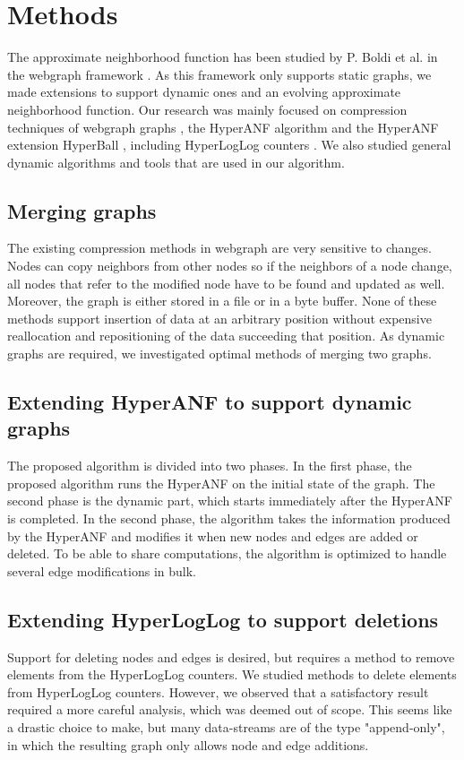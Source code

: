 \chapter{Methods}

The approximate neighborhood function has been studied by P. Boldi et al. in the webgraph framework \cite{webgraph}. As this framework only supports static graphs, we made extensions to support dynamic ones and an evolving approximate neighborhood function. Our research was mainly focused on compression techniques of webgraph graphs \cite{webgraph-compression}, the HyperANF algorithm \cite{hyperanf} and the HyperANF extension HyperBall \cite{hyperball}, including HyperLogLog counters \cite{hyperloglog}. We also studied general dynamic algorithms and tools that are used in our algorithm.

\section{Merging graphs}
The existing compression methods in webgraph are very sensitive to changes. Nodes can copy neighbors from other nodes so if the neighbors of a node change, all nodes that refer to the modified node have to be found and updated as well. Moreover, the graph is either stored in a file or in a byte buffer. None of these methods support insertion of data at an arbitrary position without expensive reallocation and repositioning of the data succeeding that position. As dynamic graphs are required, we investigated optimal methods of merging two graphs.

\section{Extending HyperANF to support dynamic graphs}
The proposed algorithm is divided into two phases. In the first phase, the proposed algorithm runs the HyperANF on the initial state of the graph. The second phase is the dynamic part, which starts immediately after the HyperANF is completed. In the second phase, the algorithm takes the information produced by the HyperANF and modifies it when new nodes and edges are added or deleted. To be able to share computations, the algorithm is optimized to handle several edge modifications in bulk.

\section{Extending HyperLogLog to support deletions}
Support for deleting nodes and edges is desired, but requires a method to remove elements from the HyperLogLog counters. We studied methods to delete elements from HyperLogLog counters. However, we observed that a satisfactory result required a more careful analysis, which was deemed out of scope. This seems like a drastic choice to make, but many data-streams are of the type "append-only", in which the resulting graph only allows node and edge additions.

